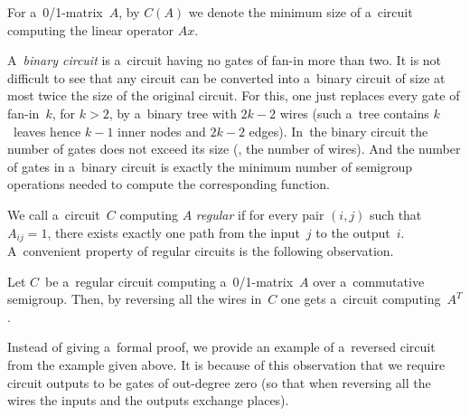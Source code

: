 \documentclass{toc}
\begin{document}
For a~0/1-matrix~$A$, by $C(A)$ we denote the minimum size of
a~circuit computing the linear operator $Ax$.


A~\emph{binary circuit} is a~circuit having no gates of fan-in more than two. It
is not difficult to see that any circuit can be converted into a~binary circuit
of size at most twice the size of the original circuit.  For this, one just
replaces every gate of fan-in~$k$, for $k>2$, by a~binary tree with $2k-2$ wires
(such a~tree contains $k$~leaves hence $k-1$ inner nodes and $2k-2$ edges).
In~the binary circuit the number of gates does not exceed its size
(\ie, the number of wires). And the number of gates in a~binary
circuit is exactly the minimum number of semigroup operations needed to
compute the corresponding function.

We call a~circuit~$C$ computing $A$ \emph{regular} if for every pair $(i,j)$
such that $A_{ij}=1$, there exists exactly one path from the input~$j$ to the
output~$i$. A~convenient property of regular circuits is the following
observation.

\begin{observation}\label{obs:transpose}
Let $C$~be a~regular circuit computing a~0/1-matrix~$A$ over a~commutative
semigroup. Then, by reversing all the wires in~$C$ one gets a~circuit
computing~$A^T$.
\end{observation}

Instead of giving a~formal proof, we provide an example of a~reversed circuit
from the example given above. It is because of this observation that we require
circuit outputs to be gates of out-degree zero (so that when reversing all the
wires the inputs and the outputs exchange places).
\end{document}
